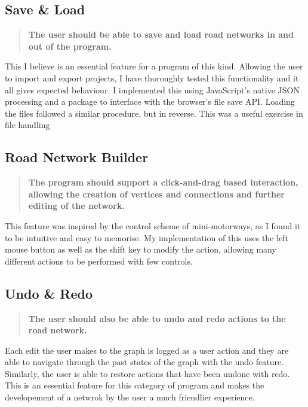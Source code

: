     \subsection{Save \& Load}

        \begin{quote}
            \textbf{The user should be able to save and load road networks in and out of the program.}
        \end{quote}

        This I believe is an essential feature for a program of this kind. Allowing the user to import and export projects, I have thoroughly tested this functionality and it all gives expected behaviour. I implemented this using JavaScript's native JSON processing and a package to interface with the browser's file save API. Loading the files followed a similar procedure, but in reverse. This was a useful exercise in file handling

    \subsection{Road Network Builder}

        \begin{quote}
            \textbf{The program should support a click-and-drag based interaction, allowing the creation of vertices and connections and further editing of the network.}
        \end{quote}

        This feature was inspired by the control scheme of mini-motorways, as I found it to be intuitive and easy to memorise. My implementation of this uses the left mouse button as well as the shift key to modify the action, allowing many different actions to be performed with few controls.

    \subsection{Undo \& Redo}

        \begin{quote}
            \textbf{The user should also be able to undo and redo actions to the road network.}
        \end{quote}

        Each edit the user makes to the graph is logged as a user action and they are able to navigate through the past states of the graph with the undo feature. Similarly, the user is able to restore actions that have been undone with redo. This is an essential feature for this category of program and makes the developement of a netwrok by the user a much friendlier experience.

